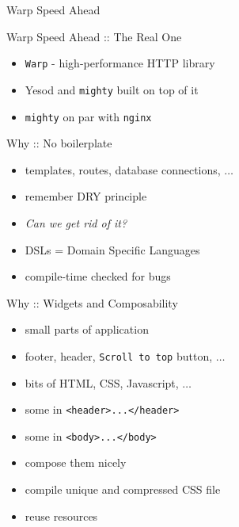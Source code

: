 \documentclass{beamer}
\begin{document}
\begin{frame}{Warp Speed Ahead}
  \begin{center}\end{center}
\end{frame}

\begin{frame}{Warp Speed Ahead :: The Real One}
  \begin{itemize}[<+->]
    \item \texttt{Warp} - high-performance HTTP library
    \item Yesod and \texttt{mighty} built on top of it
    \item \texttt{mighty} on par with \texttt{nginx}
  \end{itemize}
\end{frame}

\begin{frame}{Why :: No boilerplate}
  \begin{center}\end{center}
  \pause
  \begin{itemize}[<+->]
    \item templates, routes, database connections, $\ldots$
    \item remember DRY principle
    \item \textit{Can we get rid of it?}
    \item DSLs = Domain Specific Languages
    \item compile-time checked for bugs
  \end{itemize}
\end{frame}

\begin{frame}{Why :: Widgets and Composability}
  \begin{itemize}[<+->]
    \item small parts of application
    \item footer, header, \texttt{Scroll to top} button, $\ldots$
    \item bits of HTML, CSS, Javascript, $\ldots$
    \item some in \texttt{<header>...</header>}
    \item some in \texttt{<body>...</body>}
    \item compose them nicely
    \item compile unique and compressed CSS file
    \item reuse resources
  \end{itemize}
\end{frame}
\end{document}
